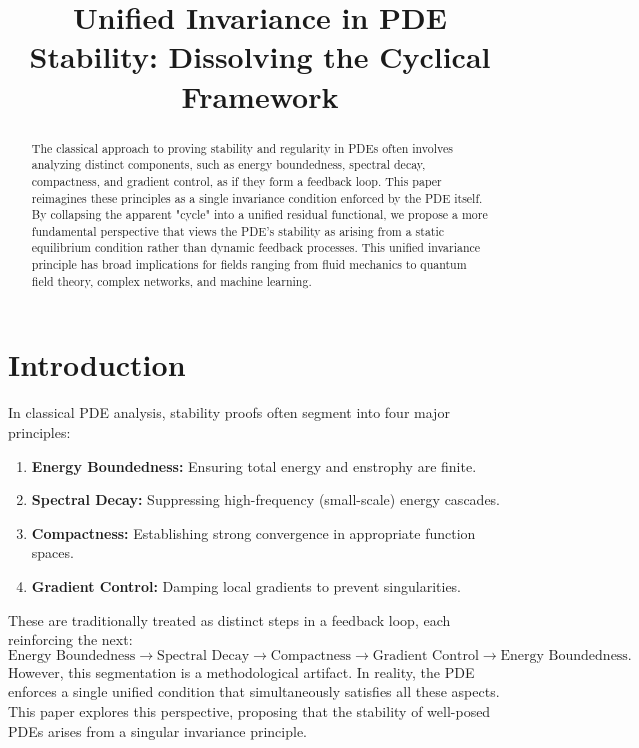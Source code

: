 \documentclass[12pt]{article}
\title{Unified Invariance in PDE Stability: Dissolving the Cyclical Framework}
\author{}
\date{}
\begin{document}
\maketitle

\begin{abstract}
The classical approach to proving stability and regularity in PDEs often involves analyzing distinct components, such as energy boundedness, spectral decay, compactness, and gradient control, as if they form a feedback loop. This paper reimagines these principles as a single invariance condition enforced by the PDE itself. By collapsing the apparent "cycle" into a unified residual functional, we propose a more fundamental perspective that views the PDE’s stability as arising from a static equilibrium condition rather than dynamic feedback processes. This unified invariance principle has broad implications for fields ranging from fluid mechanics to quantum field theory, complex networks, and machine learning.
\end{abstract}

\section{Introduction}
In classical PDE analysis, stability proofs often segment into four major principles:
\begin{enumerate}
    \item \textbf{Energy Boundedness:} Ensuring total energy and enstrophy are finite.
    \item \textbf{Spectral Decay:} Suppressing high-frequency (small-scale) energy cascades.
    \item \textbf{Compactness:} Establishing strong convergence in appropriate function spaces.
    \item \textbf{Gradient Control:} Damping local gradients to prevent singularities.
\end{enumerate}
These are traditionally treated as distinct steps in a feedback loop, each reinforcing the next:
\begin{equation*}
\text{Energy Boundedness} \to \text{Spectral Decay} \to \text{Compactness} \to \text{Gradient Control} \to \text{Energy Boundedness.}
\end{equation*}
However, this segmentation is a methodological artifact. In reality, the PDE enforces a single unified condition that simultaneously satisfies all these aspects. This paper explores this perspective, proposing that the stability of well-posed PDEs arises from a singular invariance principle.
\end{document}
